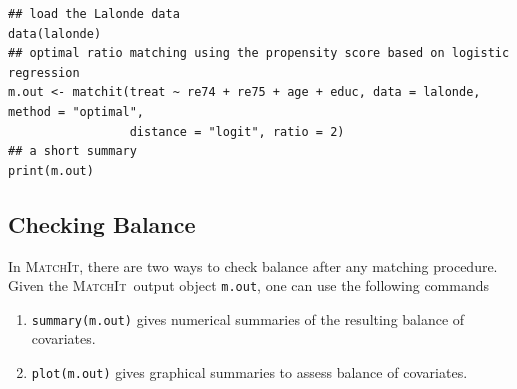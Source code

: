 \documentclass[oneside,letterpaper,titlepage]{article}
\newcommand{\MatchIt}{\textsc{MatchIt}}
\begin{document}
\begin{verbatim}
## load the Lalonde data
data(lalonde)
## optimal ratio matching using the propensity score based on logistic regression
m.out <- matchit(treat ~ re74 + re75 + age + educ, data = lalonde, method = "optimal", 
                 distance = "logit", ratio = 2)
## a short summary
print(m.out)
\end{verbatim}



\subsection{Checking Balance}
\label{subsec:balance}

In \MatchIt, there are two ways to check balance after any matching
procedure. Given the \MatchIt\ output object {\tt m.out}, one can use
the following commands
\begin{enumerate}
\item \texttt{summary(m.out)} gives numerical summaries of the
  resulting balance of covariates.

\item \texttt{plot(m.out)} gives graphical summaries to assess balance
  of covariates.
\end{enumerate}


\end{document}
